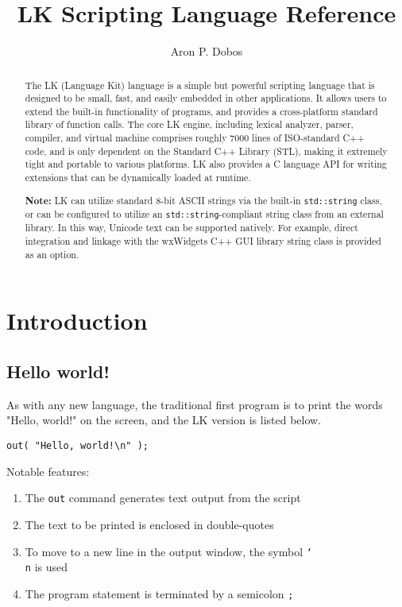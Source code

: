 \documentclass{article}
\title{LK Scripting Language Reference}
\author{Aron P. Dobos}
\newcommand\bslash{\char`\\}
\begin{document}
\maketitle
\vspace{3in}
\begin{abstract}
The LK (Language Kit) language is a simple but powerful scripting language that is designed to be small, fast, and easily embedded in other applications.  It allows users to extend the built-in functionality of programs, and provides a cross-platform standard library of function calls.  The core LK engine, including lexical analyzer, parser, compiler, and virtual machine comprises roughly 7000 lines of ISO-standard C++ code, and is only dependent on the Standard C++ Library (STL), making it extremely tight and portable to various platforms.  LK also provides a C language API for writing extensions that can be dynamically loaded at runtime.

\textbf{Note:} LK can utilize standard 8-bit ASCII strings via the built-in \texttt{std::string} class, or can be configured to utilize an \texttt{std::string}-compliant string class from an external library.  In this way, Unicode text can be supported natively.  For example, direct integration and linkage with the wxWidgets C++ GUI library string class is provided as an option.
\end{abstract} 

\newpage
\tableofcontents
\newpage
\section{Introduction}
\subsection{Hello world!}

As with any new language, the traditional first program is to print the words "Hello, world!" on the screen, and the LK version is listed below.

\begin{verbatim}
out( "Hello, world!\n" );
\end{verbatim}

Notable features:
\begin{enumerate}
\item The \texttt{out} command generates text output from the script
\item The text to be printed is enclosed in double-quotes
\item To move to a new line in the output window, the symbol \texttt{\bslash n} is used
\item The program statement is terminated by a semicolon \texttt{;}
\end{enumerate}
\end{document}
